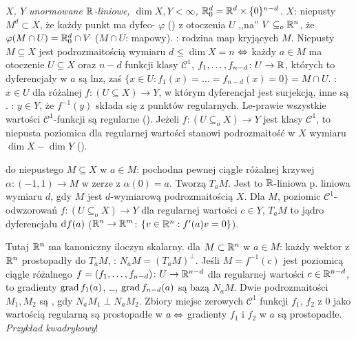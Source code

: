 \emph{$X$, $Y$ unormowane  $\mathbb{R}$-liniowe, $\dim X,Y < \infty$, $\mathbb{R}_0^d = \mathbb{R}^d \times \{0\}^{n-d}$.} %
 $X$: niepusty $M^d \subset X$, że każdy punkt ma dyfeo- $\varphi$ () z otoczenia $U$ ,,na'' $V \subseteq_o \mathbb{R}^n$, że $\varphi(M \cap U) = \mathbb{R}_0^d \cap V$ ($M \cap U$: mapowy).
: rodzina map kryjących $M$.
Niepusty $M \subseteq X$ jest podrozmaitością wymiaru $d \le \dim X = n$ $\Leftrightarrow$ każdy $a \in M$ ma otoczenie $U \subseteq X$ oraz $n-d$ funkcji klasy $\mathscr C^1$, $f_1, \ldots, f_{n-d} \colon U \to \mathbb{R}$, których to dyferencjały w $a$ są lnz, zaś $\{x \in U : f_1(x) = \ldots = f_{n-d}(x) = 0\} = M \cap U$.
: $x \in U$ dla różalnej $f \colon (U \subseteq X) \to Y$, w którym dyferencjał jest surjekcją, inne są .
: $y \in Y$, że $f^{-1}(y)$ składa się z punktów regularnych.
Le-prawie wszystkie wartości $\mathscr C^1$-funkcji są regularne ().
Jeżeli $f \colon (U \subseteq_o X) \to Y$ jest klasy $\mathscr C^1$, to niepusta poziomica dla regularnej wartości stanowi podrozmaitość w $X$ wymiaru $\dim X -  \dim Y$ ().

  do niepustego $M \subseteq X$ w $a \in M$: pochodna pewnej ciągle różalnej krzywej $\alpha \colon (-1, 1) \to M$ w zerze z $\alpha(0) = a$.
Tworzą  $T_aM$.
Jest to $\mathbb{R}$-liniowa p. liniowa wymiaru $d$, gdy $M$ jest $d$-wymiarową podrozmaitością $X$.
Dla $M$, poziomic $\mathscr C^1$-odwzorowań $f \colon (U \subseteq_o X) \to Y$ dla regularnej wartości $c \in Y$, $T_aM$ to jądro dyferencjału $\textrm{d} f(a)$ ($\mathbb{R}^n \to \mathbb{R}^m$: $\{v \in \mathbb{R}^n : f'(a) v = 0\}$).
	
Tutaj  $\mathbb{R}^n$ ma kanoniczny iloczyn skalarny.
 dla $M \subset \mathbb{R}^n$ w $a \in M$: każdy wektor z $\mathbb{R}^n$ prostopadły do $T_aM$, : $N_aM = (T_aM)^\perp$.
Jeśli $M = f^{-1}(c)$ jest poziomicą ciągle różalnego $f = (f_1, \dots, f_{n-d}) \colon U \to \mathbb{R}^{n-d}$ dla regularnej wartości $c \in \mathbb{R}^{n-d}$, to gradienty $\operatorname{grad} f_1(a)$, \dots, $\operatorname{grad} f_{n-d}(a)$ są bazą $N_aM$.
Dwie podrozmaitości $M_1, M_2$ są , gdy $N_aM_1 \perp N_aM_2$.
Zbiory miejsc zerowych $\mathscr C^1$ funkcji $f_1$, $f_2$ z $0$ jako wartością regularną są prostopadłe w $a \Leftrightarrow$ gradienty $f_1$ i $f_2$ w $a$ są prostopadłe.
\emph{Przykład kwadrykowy}!

